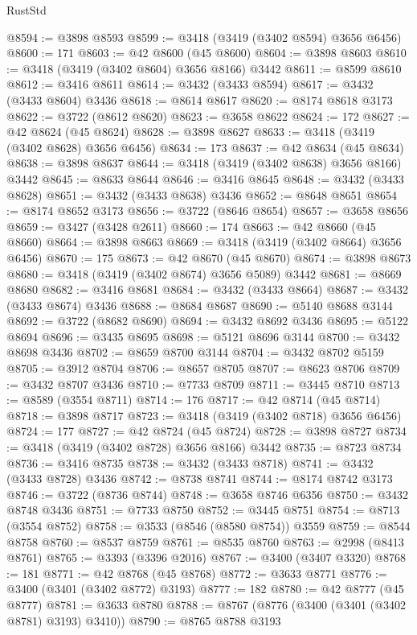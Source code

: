 \begin{lexlean}{RustStd}
\begin{coremodule}
@8594 := @3898 @8593
@8599 := @3418 (@3419 (@3402 @8594) @3656 @6456)
@8600 := 171
@8603 := @42 @8600 (@45 @8600)
@8604 := @3898 @8603
@8610 := @3418 (@3419 (@3402 @8604) @3656 @8166) @3442
@8611 := @8599 @8610
@8612 := @3416 @8611
@8614 := @3432 (@3433 @8594)
@8617 := @3432 (@3433 @8604) @3436
@8618 := @8614 @8617
@8620 := @8174 @8618 @3173
@8622 := @3722 (@8612 @8620)
@8623 := @3658 @8622
@8624 := 172
@8627 := @42 @8624 (@45 @8624)
@8628 := @3898 @8627
@8633 := @3418 (@3419 (@3402 @8628) @3656 @6456)
@8634 := 173
@8637 := @42 @8634 (@45 @8634)
@8638 := @3898 @8637
@8644 := @3418 (@3419 (@3402 @8638) @3656 @8166) @3442
@8645 := @8633 @8644
@8646 := @3416 @8645
@8648 := @3432 (@3433 @8628)
@8651 := @3432 (@3433 @8638) @3436
@8652 := @8648 @8651
@8654 := @8174 @8652 @3173
@8656 := @3722 (@8646 @8654)
@8657 := @3658 @8656
@8659 := @3427 (@3428 @2611)
@8660 := 174
@8663 := @42 @8660 (@45 @8660)
@8664 := @3898 @8663
@8669 := @3418 (@3419 (@3402 @8664) @3656 @6456)
@8670 := 175
@8673 := @42 @8670 (@45 @8670)
@8674 := @3898 @8673
@8680 := @3418 (@3419 (@3402 @8674) @3656 @5089) @3442
@8681 := @8669 @8680
@8682 := @3416 @8681
@8684 := @3432 (@3433 @8664)
@8687 := @3432 (@3433 @8674) @3436
@8688 := @8684 @8687
@8690 := @5140 @8688 @3144
@8692 := @3722 (@8682 @8690)
@8694 := @3432 @8692 @3436
@8695 := @5122 @8694
@8696 := @3435 @8695
@8698 := @5121 @8696 @3144
@8700 := @3432 @8698 @3436
@8702 := @8659 @8700 @3144
@8704 := @3432 @8702 @5159
@8705 := @3912 @8704
@8706 := @8657 @8705
@8707 := @8623 @8706
@8709 := @3432 @8707 @3436
@8710 := @7733 @8709
@8711 := @3445 @8710
@8713 := @8589 (@3554 @8711)
@8714 := 176
@8717 := @42 @8714 (@45 @8714)
@8718 := @3898 @8717
@8723 := @3418 (@3419 (@3402 @8718) @3656 @6456)
@8724 := 177
@8727 := @42 @8724 (@45 @8724)
@8728 := @3898 @8727
@8734 := @3418 (@3419 (@3402 @8728) @3656 @8166) @3442
@8735 := @8723 @8734
@8736 := @3416 @8735
@8738 := @3432 (@3433 @8718)
@8741 := @3432 (@3433 @8728) @3436
@8742 := @8738 @8741
@8744 := @8174 @8742 @3173
@8746 := @3722 (@8736 @8744)
@8748 := @3658 @8746 @6356
@8750 := @3432 @8748 @3436
@8751 := @7733 @8750
@8752 := @3445 @8751
@8754 := @8713 (@3554 @8752)
@8758 := @3533 (@8546 (@8580 @8754)) @3559
@8759 := @8544 @8758
@8760 := @8537 @8759
@8761 := @8535 @8760
@8763 := @2998 (@8413 @8761)
@8765 := @3393 (@3396 @2016)
@8767 := @3400 (@3407 @3320)
@8768 := 181
@8771 := @42 @8768 (@45 @8768)
@8772 := @3633 @8771
@8776 := @3400 (@3401 (@3402 @8772) @3193)
@8777 := 182
@8780 := @42 @8777 (@45 @8777)
@8781 := @3633 @8780
@8788 := @8767 (@8776 (@3400 (@3401 (@3402 @8781) @3193) @3410))
@8790 := @8765 @8788 @3193

\end{coremodule}
\end{lexlean}
